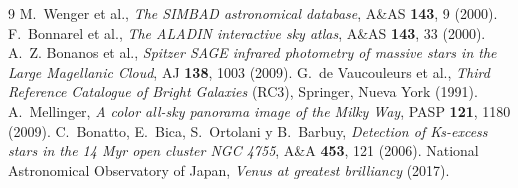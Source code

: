 \documentclass[11pt,a4paper]{article}
\begin{document}
\begin{thebibliography}{9}
 M.~Wenger et al., \emph{The SIMBAD astronomical database}, A\&AS \textbf{143}, 9 (2000).
 F.~Bonnarel et al., \emph{The ALADIN interactive sky atlas}, A\&AS \textbf{143}, 33 (2000).
 A.~Z. Bonanos et al., \emph{Spitzer SAGE infrared photometry of massive stars in the
Large Magellanic Cloud}, AJ \textbf{138}, 1003 (2009).
 G.~de Vaucouleurs et al., \emph{Third Reference Catalogue of Bright Galaxies} (RC3),
Springer, Nueva York (1991).
 A.~Mellinger, \emph{A color all-sky panorama image of the Milky Way}, PASP
\textbf{121}, 1180 (2009).
 C.~Bonatto, E.~Bica, S.~Ortolani y B.~Barbuy, \emph{Detection of Ks-excess stars in
the 14 Myr open cluster NGC 4755}, A\&A \textbf{453}, 121 (2006).
 National Astronomical Observatory of Japan, \emph{Venus at greatest brilliancy} (2017).
\end{thebibliography}
\end{document}
